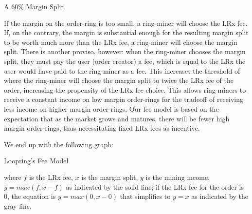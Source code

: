 \documentclass[UTF8,nofonts]{article}
\makeatletter
\newenvironment{figurehere}
 {\def\@captype{figure}}
 {}
\makeatother
\begin{document}
\begin{multicols}{2}
\begin{center}
\begin{figurehere}
\begin{tikzpicture}[
scale=1,
font=\bfseries\footnotesize\sffamily,
classical/.style={thick,<->,shorten >=2pt,shorten <=2pt,>=stealth},
oneway/.style={->,dashed,shorten >=2pt,shorten <=2pt,>=stealth}
]
\end{tikzpicture}
\caption{A 60\% Margin Split}
\label{fig:marginsplit}
\end{figurehere}
\end{center}

If the margin on the order-ring is too small, a ring-miner will choose the LRx fee. If, on the contrary, the margin is substantial enough for the resulting margin split to be worth much more than the LRx fee, a ring-miner will choose the margin split. There is another proviso, however: when the ring-miner chooses the margin split, they must pay the user (order creator) a fee, which is equal to the LRx the user would have paid to the ring-miner as a fee. This increases the threshold of where the ring-miner will choose the margin split to twice the LRx fee of the order, increasing the propensity of the LRx fee choice. This allows ring-miners to receive a constant income on low margin order-rings for the tradeoff of receiving less income on higher margin order-rings. Our fee model is based on the expectation that as the market grows and matures, there will be fewer high margin order-rings, thus necessitating fixed LRx fees as incentive.


We end up with the following graph:

\begin{center}
\begin{figurehere}
\centering
{}
\caption{Loopring's Fee Model}
\label{fig:feemodel}
\end{figurehere}
\end{center}


where $f$ is the LRx fee, $x$ is the margin split, $y$ is the mining income. $y=max(f, x-f)$ as indicated by the solid line; if the LRx fee for the order is $0$, the equation is $y=max(0, x - 0)$ that simplifies to $y=x$ as indicated by the gray line.



\end{multicols}
\end{document}
